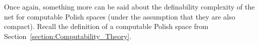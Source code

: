 Once again, something more can be said about the definability complexity of the net for computable Polish spaces (under the assumption that they are also compact). Recall the definition of a computable Polish space from Section~\ref{section:Computability_Theory}.





